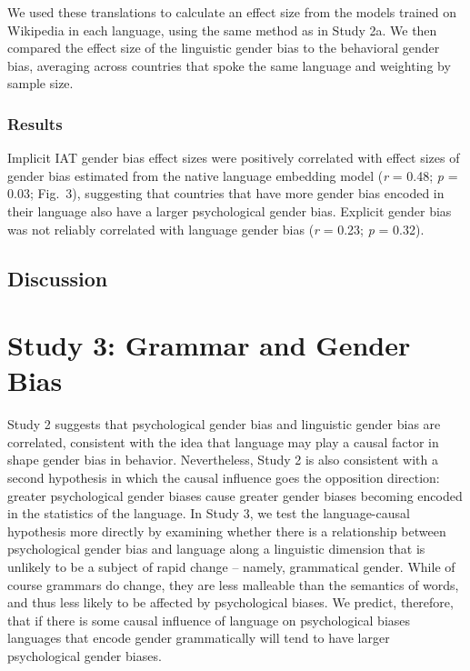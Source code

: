 \documentclass[10pt, letterpaper]{article}
\begin{document}
We used these translations to calculate an effect size from the models
trained on Wikipedia in each language, using the same method as in Study
2a. We then compared the effect size of the linguistic gender bias to
the behavioral gender bias, averaging across countries that spoke the
same language and weighting by sample size.

\subsubsection{Results}\label{results-2}

Implicit IAT gender bias effect sizes were positively correlated with
effect sizes of gender bias estimated from the native language embedding
model (\emph{r} = 0.48; \emph{p} = 0.03; Fig.~3), suggesting that
countries that have more gender bias encoded in their language also have
a larger psychological gender bias. Explicit gender bias was not
reliably correlated with language gender bias (\emph{r} = 0.23; \emph{p}
= 0.32).

\subsection{Discussion}\label{discussion-1}

\section{Study 3: Grammar and Gender
Bias}\label{study-3-grammar-and-gender-bias}

Study 2 suggests that psychological gender bias and linguistic gender
bias are correlated, consistent with the idea that language may play a
causal factor in shape gender bias in behavior. Nevertheless, Study 2 is
also consistent with a second hypothesis in which the causal influence
goes the opposition direction: greater psychological gender biases cause
greater gender biases becoming encoded in the statistics of the
language. In Study 3, we test the language-causal hypothesis more
directly by examining whether there is a relationship between
psychological gender bias and language along a linguistic dimension that
is unlikely to be a subject of rapid change -- namely, grammatical
gender. While of course grammars do change, they are less malleable than
the semantics of words, and thus less likely to be affected by
psychological biases. We predict, therefore, that if there is some
causal influence of language on psychological biases languages that
encode gender grammatically will tend to have larger psychological
gender biases.
\end{document}
